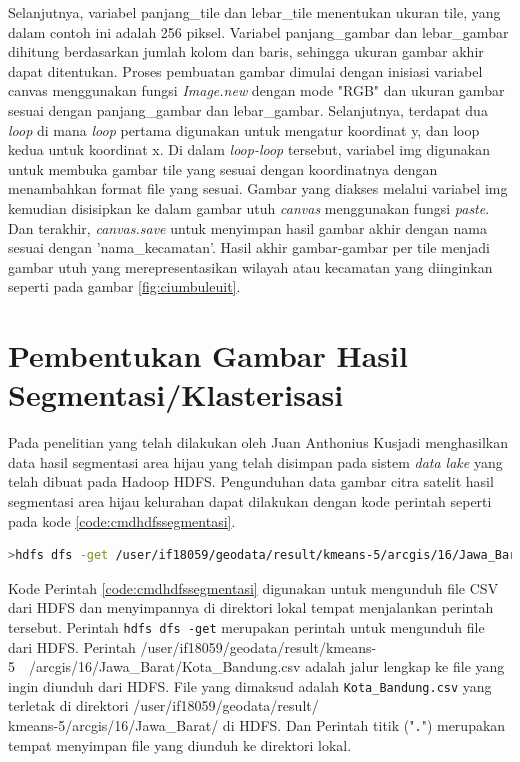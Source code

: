 Selanjutnya, variabel panjang\_tile dan lebar\_tile menentukan ukuran tile, yang dalam contoh ini adalah 256 piksel. Variabel panjang\_gambar dan lebar\_gambar dihitung berdasarkan jumlah kolom dan baris, sehingga ukuran gambar akhir dapat ditentukan. Proses pembuatan gambar  dimulai dengan inisiasi variabel canvas menggunakan fungsi \textit{Image.new }dengan mode "RGB" dan ukuran gambar sesuai dengan panjang\_gambar dan lebar\_gambar. Selanjutnya, terdapat dua \textit{loop} di mana \textit{loop} pertama digunakan untuk mengatur koordinat y, dan loop kedua untuk koordinat x. Di dalam \textit{loop-loop} tersebut, variabel img digunakan untuk membuka gambar tile yang sesuai dengan koordinatnya dengan menambahkan format file yang sesuai. Gambar yang diakses melalui variabel img kemudian disisipkan ke dalam gambar utuh \textit{canvas} menggunakan fungsi \textit{paste}. Dan terakhir, \textit{canvas.save} untuk menyimpan hasil gambar akhir dengan nama sesuai dengan 'nama\_kecamatan'. Hasil akhir gambar-gambar per tile menjadi gambar utuh yang merepresentasikan wilayah atau kecamatan yang diinginkan seperti pada gambar \ref{fig:ciumbuleuit}.

\section{Pembentukan Gambar Hasil Segmentasi/Klasterisasi}
Pada penelitian yang telah dilakukan oleh Juan Anthonius Kusjadi menghasilkan data hasil segmentasi area hijau yang telah disimpan pada sistem \textit{data lake }yang telah dibuat pada Hadoop
HDFS.\cite{juan:22:pengumpulan} Pengunduhan data gambar citra satelit hasil segmentasi area hijau kelurahan dapat dilakukan dengan kode perintah seperti pada kode \ref{code:cmdhdfssegmentasi}.

\begin{lstlisting}[language=Bash, caption= Pengembailan Data Hasil Segemntasi,label={code:cmdhdfssegmentasi}]
	>hdfs dfs -get /user/if18059/geodata/result/kmeans-5/arcgis/16/Jawa_Barat/Kota_Bandung.csv .	
\end{lstlisting}

Kode Perintah \ref{code:cmdhdfssegmentasi} digunakan untuk mengunduh file CSV dari HDFS dan menyimpannya di direktori lokal tempat menjalankan perintah tersebut. Perintah \texttt{hdfs dfs -get} merupakan perintah untuk mengunduh file dari HDFS. Perintah /user/if18059/geodata/result/kmeans-5~~/arcgis/16/Jawa\_Barat/Kota\_Bandung.csv adalah jalur lengkap ke file yang ingin diunduh dari HDFS. File yang dimaksud adalah \texttt{Kota\_Bandung.csv} yang terletak di direktori /user/if18059/geodata/result/\\kmeans-5/arcgis/16/Jawa\_Barat/ di HDFS. Dan Perintah titik ("\texttt{.}") merupakan tempat menyimpan file yang diunduh ke direktori lokal.

